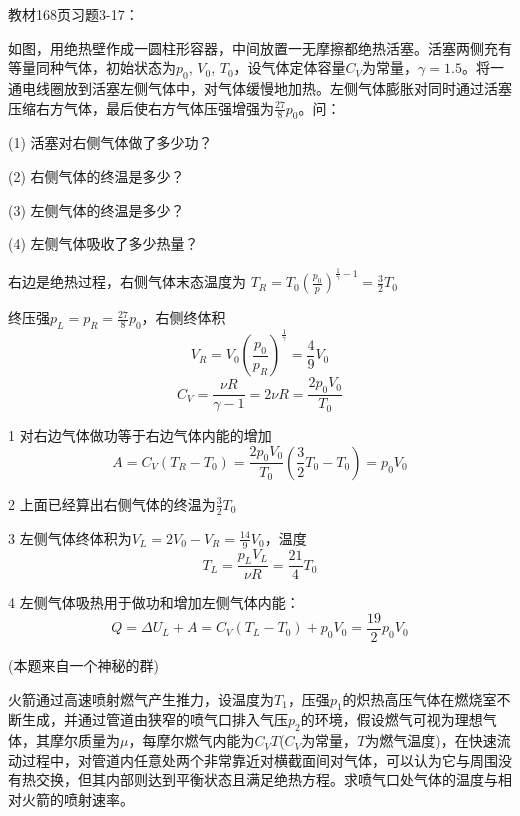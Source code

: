 \documentclass[CJK]{beamer}
\begin{document}
\begin{frame}
  \chtitle{\proid (\stwo)}
  \bch
  教材168页习题3-17：
  
  如图，用绝热壁作成一圆柱形容器，中间放置一无摩擦都绝热活塞。活塞两侧充有等量同种气体，初始状态为$p_0$, $V_0$, $T_0$，设气体定体容量$C_V$为常量，$\gamma = 1.5$。将一通电线圈放到活塞左侧气体中，对气体缓慢地加热。左侧气体膨胀对同时通过活塞压缩右方气体，最后使右方气体压强增强为$\frac{27}{8}p_0$。问：
  \bitem
\item[(1)]{活塞对右侧气体做了多少功？}
\item[(2)]{右侧气体的终温是多少？}
\item[(3)]{左侧气体的终温是多少？}
\item[(4)]{左侧气体吸收了多少热量？}  
  \eitem
  \emini
  \emini
  \ech
\end{frame}

\begin{frame}
  \bch
  {\scriptsize
    右边是绝热过程，右侧气体末态温度为
    $T_R = T_0\left(\frac{p_0}{p}\right)^{\frac{1}{\gamma}-1} = \frac{3}{2}T_0$
    
    终压强$p_L=p_R=\frac{27}{8}p_0$，右侧终体积
    $$V_R = V_0\left(\frac{p_0}{p_R}\right)^{\frac{1}{\gamma}} = \frac{4}{9}V_0$$
    $$C_V = \frac{\nu R}{\gamma - 1} = 2 \nu R = \frac{2p_0V_0}{T_0}$$
  
    \bitem
  \item[1]{对右边气体做功等于右边气体内能的增加
    $$A = C_V(T_R-T_0) = \frac{2p_0V_0}{T_0}\left(\frac{3}{2}T_0-T_0\right) = p_0V_0$$}
  \item[2]{上面已经算出右侧气体的终温为$\frac{3}{2}T_0$}
  \item[3]{左侧气体终体积为$V_L=2V_0-V_R = \frac{14}{9}V_0$，温度
    $$T_L = \frac{p_LV_L}{\nu R} = \frac{21}{4}T_0$$}
  \item[4]{左侧气体吸热用于做功和增加左侧气体内能：
    $$ Q = \Delta U_L + A = C_V(T_L-T_0) + p_0V_0 = \frac{19}{2}p_0V_0$$}
    \eitem
  }
  \ech
\end{frame}


\begin{frame}
  \chtitle{\proid (\sthree)}
  \bch
  (本题来自一个神秘的群)

  \skipline
  
  火箭通过高速喷射燃气产生推力，设温度为$T_1$，压强$p_1$的炽热高压气体在燃烧室不断生成，并通过管道由狭窄的喷气口排入气压$p_2$的环境，假设燃气可视为理想气体，其摩尔质量为$\mu$，每摩尔燃气内能为$C_VT$($C_V$为常量，$T$为燃气温度)，在快速流动过程中，对管道内任意处两个非常靠近对横截面间对气体，可以认为它与周围没有热交换，但其内部则达到平衡状态且满足绝热方程。求喷气口处气体的温度与相对火箭的喷射速率。
  \ech
\end{frame}
\end{document}
